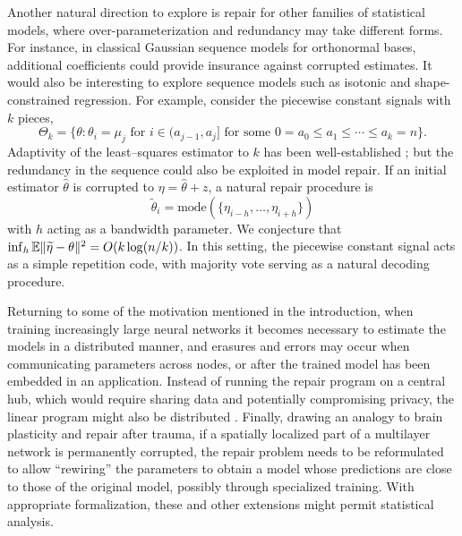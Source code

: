Another natural direction to explore is repair for other families of statistical models, where over-parameterization and redundancy may take different forms. For instance, in classical Gaussian sequence models for orthonormal bases, additional coefficients could provide insurance against corrupted estimates.
It would also be interesting
to explore sequence models such as isotonic and shape-constrained regression. For example, consider the piecewise constant signals with $k$ pieces,
$$\Theta_k  = \{\theta : \mbox{$\theta_i = \mu_j$ for $i\in (a_{j-1}, a_j]$ for
some $0=a_0 \leq a_1\leq \cdots \leq a_k=n$}\}.$$
Adaptivity of the least--squares estimator to $k$ has been well-established
\citep{chatterjee2015risk,Chat14,bellec}; but
the redundancy in the sequence could also be exploited in model repair. If an initial estimator $\hat \theta$ is
corrupted to $\eta = \hat\theta + z$, a natural repair procedure is
$$\tilde \theta_i = \text{mode}(\{\eta_{i-h},\ldots,\eta_{i+h}\})$$
with $h$ acting as a bandwidth parameter. We conjecture that
$\inf_h \mathbb{E}\|\widetilde\eta -\theta\|^2 = O(k \log (n/k))$. In this setting,
the piecewise constant signal acts as a simple repetition code, with majority vote
serving as a natural decoding procedure.

Returning to some of the motivation mentioned in the introduction, when training increasingly large neural networks
it becomes necessary to estimate the models in a distributed manner, and erasures and errors may occur when
communicating parameters across nodes, or after the trained model has been embedded in an application.
Instead of running the repair program on a central hub,
which would require sharing data and potentially compromising privacy, the linear program
might also be distributed \citep{hong12}. Finally, drawing an analogy to brain plasticity and repair after trauma, if a spatially localized part of a multilayer network is permanently corrupted, the repair problem needs to be reformulated to allow ``rewiring'' the parameters to obtain a model whose predictions are close to those of the original model, possibly through specialized training. With appropriate formalization, these and other extensions might permit statistical analysis.
